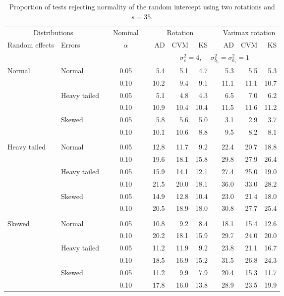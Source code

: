 \begin{table}[ht]
\centering
\caption{\label{tab:fixedsimb035} Proportion of tests rejecting normality of the random intercept using two rotations and $s = 35$.}
\begin{scriptsize}
\begin{tabular}{ll p{.1cm} c p{.1cm} rrr p{.1cm} rrr}
  \hline
  \multicolumn{2}{c}{Distributions}& & Nominal & &  \multicolumn{3}{c}{Rotation} & & \multicolumn{3}{c}{Varimax rotation} \\ \cline{1-2} \cline{6-8} \cline{10-12}   
  Random effects & Errors & & $\alpha$ & & AD & CVM & KS & & AD & CVM & KS \\ 
   \hline
& && && \multicolumn{7}{c}{$\sigma_{\varepsilon}^2 = 4$, \ \ $\sigma_{b_0}^2 = \sigma_{b_1}^2 = 1$} \\ \cline{6-12}
\rowcolor{gray!20} Normal & Normal &  & 0.05 &  & 5.4 & 5.1 & 4.7 &  & 5.3 & 5.5 & 5.3 \\ 
\rowcolor{gray!20}    &  &  & 0.10 &  & 10.2 & 9.4 & 9.1 &  & 11.1 & 11.1 & 10.7 \\ 
\rowcolor{gray!20}    & Heavy tailed &  & 0.05 &  & 5.1 & 4.8 & 4.3 &  & 6.5 & 7.0 & 6.2 \\ 
\rowcolor{gray!20}    &  &  & 0.10 &  & 10.9 & 10.4 & 10.4 &  & 11.5 & 11.6 & 11.2 \\ 
\rowcolor{gray!20}    & Skewed &  & 0.05 &  & 5.8 & 5.6 & 5.0 &  & 3.1 & 2.9 & 3.7 \\ 
\rowcolor{gray!20}    &  &  & 0.10 &  & 10.1 & 10.6 & 8.8 &  & 9.5 & 8.2 & 8.1 \\ 
&&&&&&&&&&&\\
  Heavy tailed & Normal &  & 0.05 &  & 12.8 & 11.7 & 9.2 &  & 22.4 & 20.7 & 18.8 \\ 
   &  &  & 0.10 &  & 19.6 & 18.1 & 15.8 &  & 29.8 & 27.9 & 26.4 \\ 
   & Heavy tailed &  & 0.05 &  & 15.9 & 14.1 & 12.1 &  & 27.4 & 25.0 & 19.0 \\ 
   &  &  & 0.10 &  & 21.5 & 20.0 & 18.1 &  & 36.0 & 33.0 & 28.2 \\ 
   & Skewed &  & 0.05 &  & 14.9 & 12.8 & 10.4 &  & 23.0 & 21.4 & 18.0 \\ 
   &  &  & 0.10 &  & 20.5 & 18.9 & 18.0 &  & 30.8 & 27.7 & 25.4 \\ 
&&&&&&&&&&&\\
  Skewed & Normal &  & 0.05 &  & 10.8 & 9.2 & 8.4 &  & 18.1 & 15.4 & 12.6 \\ 
   &  &  & 0.10 &  & 20.2 & 18.1 & 15.9 &  & 29.7 & 24.0 & 20.0 \\ 
   & Heavy tailed &  & 0.05 &  & 11.2 & 11.9 & 9.2 &  & 23.8 & 21.1 & 16.7 \\ 
   &  &  & 0.10 &  & 18.5 & 16.9 & 15.2 &  & 31.5 & 26.8 & 24.3 \\ 
   & Skewed &  & 0.05 &  & 11.2 & 9.9 & 7.9 &  & 20.4 & 15.3 & 11.7 \\ 
   &  &  & 0.10 &  & 17.8 & 16.0 & 13.8 &  & 28.9 & 23.5 & 19.9 \\ 


\end{tabular}
\end{scriptsize}
\end{table}
